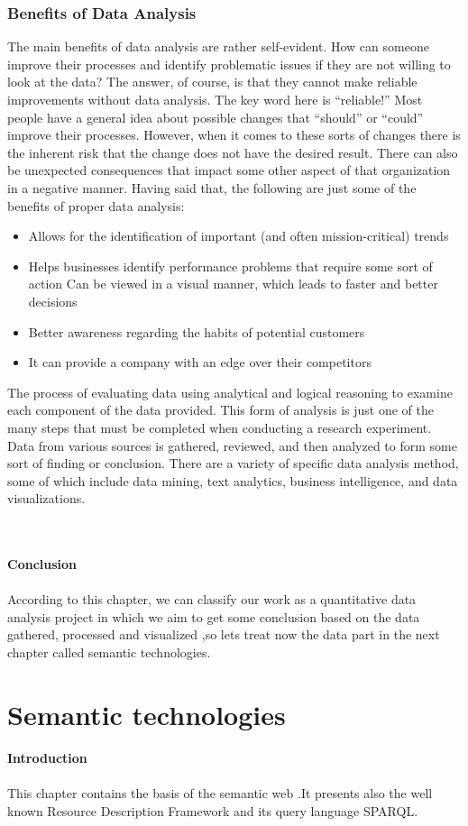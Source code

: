 \documentclass[a4paper,12pt,oneside]{report}
\begin{document}
{\subsection{Benefits of Data Analysis}
{The main benefits of data analysis are rather self-evident. How can someone improve their processes and identify problematic issues if they are not willing to look at the data? The answer, of course, is that they cannot make reliable improvements without data analysis. The key word here is “reliable!” Most people have a general idea about possible changes that “should” or “could” improve their processes. However, when it comes to these sorts of changes there is the inherent risk that the change does not have the desired result. There can also be unexpected consequences that impact some other aspect of that organization in a negative manner. Having said that, the following are just some of the benefits of proper data analysis:
\begin{itemize}
\item {Allows for the identification of important (and often mission-critical) trends}
\item {Helps businesses identify performance problems that require some sort of action Can be viewed in a visual manner, which leads to faster and better decisions}
\item {Better awareness regarding the habits of potential customers}
\item{It can provide a company with an edge over their competitors}
\end{itemize}
The process of evaluating data using analytical and logical reasoning to examine each component of the data provided. This form of analysis is just one of the many steps that must be completed when conducting a research experiment. Data from various sources is gathered, reviewed, and then analyzed to form some sort of finding or conclusion. There are a variety of specific data analysis method, some of which include data mining, text analytics, business intelligence, and data visualizations.}\\ \\
\textbf{\large Conclusion}\\ \\

{According to this chapter, we can classify our work as a quantitative data analysis project in which we aim to get some conclusion based on the data gathered, processed and visualized ,so lets treat now the data part in the next chapter called semantic technologies.}
\chapter{Semantic technologies}
\textbf{\large Introduction}\\ \\
{This chapter contains the basis of the semantic web .It presents also the well known Resource Description Framework and its query language SPARQL.}
}
\end{document}
